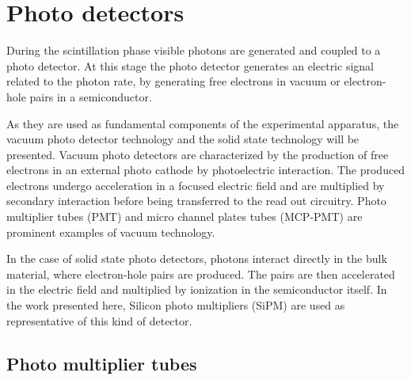 
\chapter{Photo detectors}
During the scintillation phase visible photons are generated and coupled to a photo detector. At this stage the photo detector generates an electric signal related to the photon rate, by generating free electrons in vacuum or electron-hole pairs in a semiconductor.

As they are used as fundamental components of the experimental apparatus, the vacuum photo detector technology and the solid state technology will be presented.
Vacuum photo detectors are characterized by the production of free electrons in an external photo cathode by photoelectric interaction. The produced electrons undergo acceleration in a focused electric field and are multiplied by secondary interaction before being transferred to the read out circuitry. Photo multiplier tubes (PMT) and micro channel plates tubes  (MCP-PMT) are prominent examples of vacuum technology.
  
In the case of solid state photo detectors, photons interact directly in the bulk material, where electron-hole pairs are produced. The pairs are then accelerated in the electric field and multiplied by ionization in the semiconductor itself. In the work presented here, Silicon photo multipliers (SiPM) are used as representative of this kind of detector.     

\section{Photo multiplier tubes}

